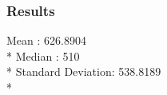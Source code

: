 \documentclass[12pt]{article}
\begin{document}
\subsubsection{Results}
Mean              : 626.8904\\*
Median            : 510\\*
Standard Deviation: 538.8189\\*
\newpage



\cite{*}
\end{document}
